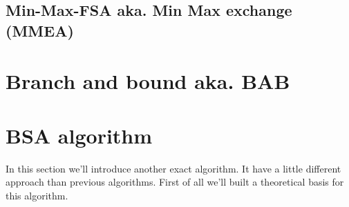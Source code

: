 

\subsection{Min-Max-FSA aka. Min Max exchange (MMEA)}

\section{Branch and bound aka. BAB}  %
\section{BSA algorithm}
In this section we'll introduce another exact algorithm. It have a little different approach than previous algorithms. First of all we'll built a theoretical basis for this algorithm.




